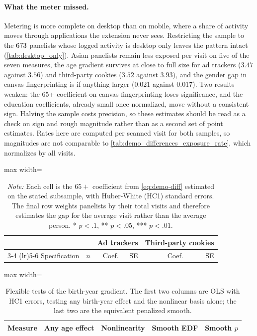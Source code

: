 \documentclass[12pt, letterpaper]{article}
\begin{document}
\paragraph{What the meter missed.}
Metering is more complete on desktop than on mobile, where a share of activity moves through applications the extension never sees. Restricting the sample to the $673$ panelists whose logged activity is desktop only leaves the pattern intact (\cref{tab:desktop_only}). Asian panelists remain less exposed per visit on five of the seven measures, the age gradient survives at close to full size for ad trackers ($3.47$ against $3.56$) and third-party cookies ($3.52$ against $3.93$), and the gender gap in canvas fingerprinting is if anything larger ($0.021$ against $0.017$). Two results weaken: the 65+ coefficient on canvas fingerprinting loses significance, and the education coefficients, already small once normalized, move without a consistent sign. Halving the sample costs precision, so these estimates should be read as a check on sign and rough magnitude rather than as a second set of point estimates. Rates here are computed per scanned visit for both samples, so magnitudes are not comparable to \cref{tab:demo_differences_exposure_rate}, which normalizes by all visits.

\begin{table}[ht]
\centering
\caption{Age gap ($65+$ vs. under $25$) under alternative treatments of the rate denominator}
\label{tab:robustness_denominator}
\begin{adjustbox}{max width=\textwidth}
\begin{tabular}{lrrrrr}
\toprule
& & \multicolumn{2}{c}{Ad trackers} & \multicolumn{2}{c}{Third-party cookies} \\
\cmidrule(lr){3-4} \cmidrule(lr){5-6}
Specification & $n$ & Coef. & SE & Coef. & SE \\
\midrule

\bottomrule
\end{tabular}
\end{adjustbox}
\caption*{\textit{Note:} Each cell is the $65+$ coefficient from \cref{eq:demo-diff}
estimated on the stated subsample, with Huber-White (HC1) standard errors. The final
row weights panelists by their total visits and therefore estimates the gap for the
average visit rather than the average person. * $p<.1$, ** $p<.05$, *** $p<.01$.}
\end{table}


\begin{table}[ht]
\centering
\caption{Flexible tests of the birth-year gradient. The first two columns are OLS with HC1 errors, testing any birth-year effect and the nonlinear basis alone; the last two are the equivalent penalized smooth.}
\label{tab:age_spline_tests}
\begin{adjustbox}{max width=\textwidth}
\begin{tabular}{lrrrr}
\toprule
Measure & Any age effect & Nonlinearity & Smooth EDF & Smooth $p$ \\
\midrule

\bottomrule
\end{tabular}
\end{adjustbox}
\end{table}
\end{document}
